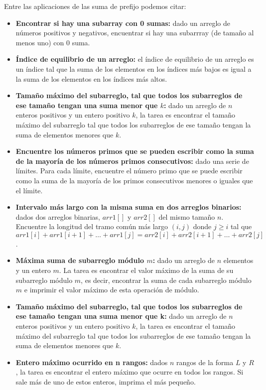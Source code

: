 Entre las aplicaciones de las suma de prefijo podemos citar:

\begin{itemize}
	\item \textbf{Encontrar si hay una subarray con 0 sumas:} dado un arreglo de números positivos y negativos, encuentrar si hay una subarrray (de tamaño al menos uno) con 0 suma.
	\item \textbf{Índice de equilibrio de un arreglo:} el índice de equilibrio de un arreglo es un índice tal que la suma de los elementos en los índices más bajos es igual a la suma de los elementos en los índices más altos.
	\item \textbf{Tamaño máximo del subarreglo, tal que todos los subarreglos de ese tamaño tengan una suma menor que $k$:} dado un arreglo de $n$ enteros positivos y un entero positivo $k$, la tarea es encontrar el tamaño máximo del subarreglo tal que todos los subarreglos de ese tamaño tengan la suma de elementos menores que $k$.
	\item \textbf{Encuentre los números primos que se pueden escribir como la suma de la mayoría de los números primos consecutivos:} dado una serie de límites. Para cada límite, encuentre el número primo que se puede escribir como la suma de la mayoría de los primos consecutivos menores o iguales que el límite.
	\item \textbf{Intervalo más largo con la misma suma en dos arreglos binarios:} dados dos arreglos binarias, $arr1[]$ y $arr2[]$ del mismo tamaño $n$. Encuentre la longitud del tramo común más largo $(i, j)$ donde $j \ge i$ tal que $arr1[i] + arr1[i+1] + \dots + arr1[j] = arr2[i] + arr2[i+1] + \dots + arr2[j]$.
	\item \textbf{Máxima suma de subarreglo módulo $m$:} dado un arreglo de $n$ elementos y un entero $m$. La tarea es encontrar el valor máximo de la suma de su subarreglo módulo $m$, es decir, encontrar la suma de cada subarreglo módulo $m$ e imprimir el valor máximo de esta operación de módulo.
	\item \textbf{Tamaño máximo del subarreglo, tal que todos los subarreglos de ese tamaño tengan una suma menor que k:} dado un arreglo de $n$ enteros positivos y un entero positivo $k$, la tarea es encontrar el tamaño máximo del subarreglo tal que todos los subarreglos de ese tamaño tengan la suma de elementos menores que $k$.
	\item \textbf{Entero máximo ocurrido en n rangos:} dados $n$ rangos de la forma $L$ y $R$, la tarea es encontrar el entero máximo que ocurre en todos los rangos. Si sale más de uno de estos enteros, imprima el más pequeño.

\end{itemize}
